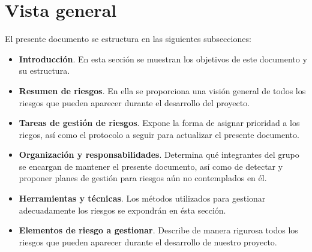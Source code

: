 \section{Vista general}
El presente documento se estructura en las siguientes subsecciones:
	\begin{itemize}
		\item {\bf Introducción}. En esta sección se muestran los objetivos de este documento y su estructura.
		\item {\bf Resumen de riesgos}. En ella se proporciona una visión general de todos los riesgos que pueden aparecer durante el desarrollo del proyecto.
		\item {\bf Tareas de gestión de riesgos}. Expone la forma de asignar prioridad a los riegos, así como el protocolo a seguir para actualizar el presente documento.
		\item {\bf Organización y responsabilidades}. Determina qué integrantes del grupo se encargan de mantener el presente documento, así como de detectar y proponer planes de gestión para riesgos aún no contemplados en él.                
		\item {\bf Herramientas y técnicas}. Los métodos utilizados para gestionar  adecuadamente los riesgos se expondrán en ésta sección.
		\item {\bf Elementos de riesgo a gestionar}. Describe de manera rigurosa todos los riesgos que pueden aparecer durante el desarrollo de nuestro proyecto.
	\end{itemize}